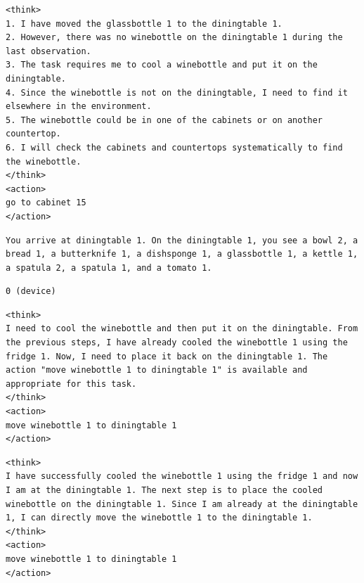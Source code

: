 \documentclass{article}
\begin{document}
\begin{devicebox}[title=Step 19: device agent output (if routed)]
\begin{lstlisting}[style=mytt]
<think>
1. I have moved the glassbottle 1 to the diningtable 1.
2. However, there was no winebottle on the diningtable 1 during the last observation.
3. The task requires me to cool a winebottle and put it on the diningtable.
4. Since the winebottle is not on the diningtable, I need to find it elsewhere in the environment.
5. The winebottle could be in one of the cabinets or on another countertop.
6. I will check the cabinets and countertops systematically to find the winebottle.
</think>
<action>
go to cabinet 15
</action>
\end{lstlisting}
\end{devicebox}

\begin{envbox}[title=Step 24: environment]
\begin{lstlisting}[style=mytt]
You arrive at diningtable 1. On the diningtable 1, you see a bowl 2, a bread 1, a butterknife 1, a dishsponge 1, a glassbottle 1, a kettle 1, a spatula 2, a spatula 1, and a tomato 1.
\end{lstlisting}
\end{envbox}

\begin{herabox}[title=Step 24: Hera decision]
\begin{lstlisting}[style=mytt]
0 (device)
\end{lstlisting}
\end{herabox}

\begin{devicebox}[title=Step 24: device agent output]
\begin{lstlisting}[style=mytt]
<think>
I need to cool the winebottle and then put it on the diningtable. From the previous steps, I have already cooled the winebottle 1 using the fridge 1. Now, I need to place it back on the diningtable 1. The action "move winebottle 1 to diningtable 1" is available and appropriate for this task.
</think>
<action>
move winebottle 1 to diningtable 1
</action>
\end{lstlisting}
\end{devicebox}

\begin{cloudbox}[title=Step 24: cloud agent output (if routed)]
\begin{lstlisting}[style=mytt]
<think>
I have successfully cooled the winebottle 1 using the fridge 1 and now I am at the diningtable 1. The next step is to place the cooled winebottle on the diningtable 1. Since I am already at the diningtable 1, I can directly move the winebottle 1 to the diningtable 1.
</think>
<action>
move winebottle 1 to diningtable 1
</action>
\end{lstlisting}
\end{cloudbox}
\end{document}
